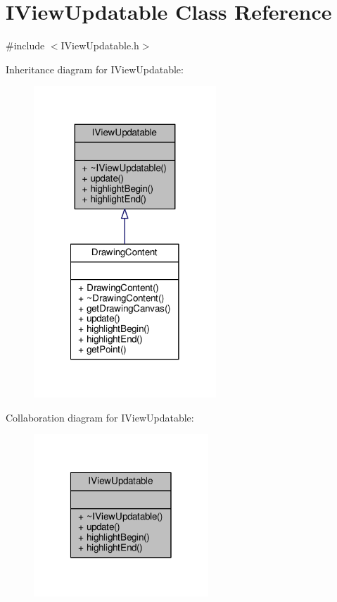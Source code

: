 \hypertarget{class_i_view_updatable}{\section{I\-View\-Updatable Class Reference}
\label{class_i_view_updatable}
}


{\ttfamily \#include $<$I\-View\-Updatable.\-h$>$}



Inheritance diagram for I\-View\-Updatable\-:\nopagebreak
\begin{figure}[H]
\begin{center}
\leavevmode
\includegraphics[width=194pt]{class_i_view_updatable__inherit__graph}
\end{center}
\end{figure}


Collaboration diagram for I\-View\-Updatable\-:
\nopagebreak
\begin{figure}[H]
\begin{center}
\leavevmode
\includegraphics[width=186pt]{class_i_view_updatable__coll__graph}
\end{center}
\end{figure}
